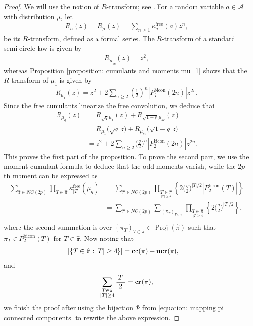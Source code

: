 \documentclass[12pt,reqno]{amsart}
\theoremstyle{plain}
\newcommand{\1}{\mathbf{1}}
\newcommand{\A}{\mathcal{A}}
\newcommand{\cumuf}{\kappa^{\operatorname{free}}}
\newcommand{\crblocks}{\operatorname{\bf cr}}
\newcommand{\ccblocks}{\operatorname{\bf cc}}
\newcommand{\ncrblocks}{\operatorname{\bf ncr}}
\newcommand{\proj}{\operatorname{Proj}}
\begin{document}
\begin{proof}
    We will use the notion of $R$-transform; see \cite[Lecture 16]{nica2006lectures}. For a random variable $a \in \A$ with distribution $\mu$, let
\begin{align*}
    R_a(z)=R_\mu(z)=\sum_{n \ge 1}\cumuf_n(a) z^n,
\end{align*}
be its $R$-transform, defined as a formal series. 
The $R$-transform of a standard semi-circle law is given by
\begin{align*}
    R_{\mu_{sc}}(z)=z^2,
\end{align*}
whereas Proposition \ref{proposition: cumulants and moments mu_1} shows that the $R$-transform of $\mu_1$ is given by
\begin{align*}
    R_{\mu_1}(z)=z^2+2\sum_{n \ge 2}\left(\frac{1}{2}\right)^{n}|P_2^{\operatorname{bicon}}(2n)|z^{2n}.
\end{align*}
Since the free cumulants linearize the free convolution, we deduce that 
\begin{align*}
R_{\mu_q}(z)&= R_{\sqrt{q}\mu_1}(z)+ R_{\sqrt{1-q} \,\mu_{sc}}(z) \\
& = R_{\mu_1}\big(\sqrt{q}\,z\big) + R_{\mu_{sc}}\big(\sqrt{1-q} \,z\big)\\
&= z^2+ 2\sum_{n\ge 2} \Big(\frac{q}{2}\Big)^{n}|P_2^{\operatorname{bicon}}(2n)|z^{2n}.
\end{align*}
This proves the first part of the proposition. 
To prove the second part, we use the moment-cumulant formula to deduce that the odd moments vanish, while the $2p$-th moment can be expressed as
\begin{align*}
\sum_{\hat{\pi}\in NC(2p)}\prod_{T \in \hat{\pi}} \cumuf_{|T|}(\mu_q)
&=\sum_{\hat{\pi}\in NC(2p)}\prod_{\underset{|T|\geq 4}{T \in \hat{\pi}}}\left\{ 2\Big(\frac{q}{2}\Big)^{|T|/2}|P_2^{\operatorname{bicon}}(T)|\right\}\\
&=\sum_{\hat{\pi}\in NC(2p)}\sum_{(\pi_T)_{T \in \hat{\pi}}}\prod_{\underset{|T|\geq 4}{T \in \hat{\pi}}} \left\{2\Big(\frac{q}{2}\Big)^{|T|/2}\right\},\\
\end{align*}
where the second summation is over $(\pi_T)_{T \in \hat{\pi}} \in \proj(\hat{\pi})$ such that $\pi_T \in P_2^{\operatorname{bicon}}(T)$ for $T \in \hat{\pi}$.
Now noting that 
\begin{align*}
    &|\{T \in \hat{\pi}:|T| \ge 4\}|=\ccblocks(\pi)-\ncrblocks(\pi), 
\end{align*}
and
$$
\sum_{\substack{T \in \hat{\pi}\\ |T| \ge 4}}\frac{|T|}{2}=\crblocks(\pi),
$$
we finish the proof after using the bijection $\Phi$ from \eqref{equation: mapping pi connected components} to rewrite the above expression.
\end{proof}
\end{document}

